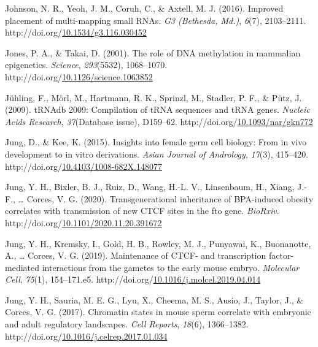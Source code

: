 \documentclass[12pt,twoside]{reedthesis}
\newlength{\cslhangindent}
\newenvironment{CSLReferences}[2] %
 {%
  \setlength{\parindent}{0pt}
  \ifodd #1 \everypar{\setlength{\hangindent}{\cslhangindent}}\ignorespaces\fi
  \ifnum #2 > 0
  \setlength{\parskip}{#2\baselineskip}
  \fi
 }%
 {}
\begin{document}
\begin{CSLReferences}{1}{0}
\leavevmode{}%
Johnson, N. R., Yeoh, J. M., Coruh, C., \& Axtell, M. J. (2016). Improved placement of multi-mapping small RNAs. \emph{G3 (Bethesda, Md.)}, \emph{6}(7), 2103--2111. http://doi.org/\href{https://doi.org/10.1534/g3.116.030452}{10.1534/g3.116.030452}

\leavevmode{}%
Jones, P. A., \& Takai, D. (2001). The role of DNA methylation in mammalian epigenetics. \emph{Science}, \emph{293}(5532), 1068--1070. http://doi.org/\href{https://doi.org/10.1126/science.1063852}{10.1126/science.1063852}

\leavevmode{}%
Jühling, F., Mörl, M., Hartmann, R. K., Sprinzl, M., Stadler, P. F., \& Pütz, J. (2009). tRNAdb 2009: Compilation of tRNA sequences and tRNA genes. \emph{Nucleic Acids Research}, \emph{37}(Database issue), D159--62. http://doi.org/\href{https://doi.org/10.1093/nar/gkn772}{10.1093/nar/gkn772}

\leavevmode{}%
Jung, D., \& Kee, K. (2015). Insights into female germ cell biology: From in vivo development to in vitro derivations. \emph{Asian Journal of Andrology}, \emph{17}(3), 415--420. http://doi.org/\href{https://doi.org/10.4103/1008-682X.148077}{10.4103/1008-682X.148077}

\leavevmode{}%
Jung, Y. H., Bixler, B. J., Ruiz, D., Wang, H.-L. V., Linsenbaum, H., Xiang, J.-F., \ldots{} Corces, V. G. (2020). Transgenerational inheritance of BPA-induced obesity correlates with transmission of new CTCF sites in the fto gene. \emph{BioRxiv}. http://doi.org/\href{https://doi.org/10.1101/2020.11.20.391672}{10.1101/2020.11.20.391672}

\leavevmode{}%
Jung, Y. H., Kremsky, I., Gold, H. B., Rowley, M. J., Punyawai, K., Buonanotte, A., \ldots{} Corces, V. G. (2019). Maintenance of CTCF- and transcription factor-mediated interactions from the gametes to the early mouse embryo. \emph{Molecular Cell}, \emph{75}(1), 154--171.e5. http://doi.org/\href{https://doi.org/10.1016/j.molcel.2019.04.014}{10.1016/j.molcel.2019.04.014}

\leavevmode{}%
Jung, Y. H., Sauria, M. E. G., Lyu, X., Cheema, M. S., Ausio, J., Taylor, J., \& Corces, V. G. (2017). Chromatin states in mouse sperm correlate with embryonic and adult regulatory landscapes. \emph{Cell Reports}, \emph{18}(6), 1366--1382. http://doi.org/\href{https://doi.org/10.1016/j.celrep.2017.01.034}{10.1016/j.celrep.2017.01.034}


\end{CSLReferences}
\end{document}
